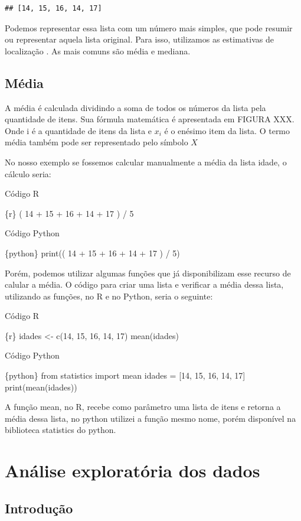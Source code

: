 \documentclass[
]{book}
\begin{document}
\begin{verbatim}
## [14, 15, 16, 14, 17]
\end{verbatim}

Podemos representar essa lista com um número mais simples, que pode resumir ou representar aquela lista original. Para isso, utilizamos as estimativas de localização \citep{bruce2020practical}. As mais comuns são média e mediana.

\section{Média}\label{muxe9dia}

A média é calculada dividindo a soma de todos os números da lista pela quantidade de itens. Sua fórmula matemática é apresentada em FIGURA XXX. Onde i é a quantidade de itens da lista e \(x_i\) é o enésimo item da lista. O termo média também pode ser representado pelo símbolo \(X\)

No nosso exemplo se fossemos calcular manualmente a média da lista idade, o cálculo seria:

Código R

\{r\} ( 14 + 15 + 16 + 14 + 17 ) / 5

Código Python

\{python\} print(( 14 + 15 + 16 + 14 + 17 ) / 5)

Porém, podemos utilizar algumas funções que já disponibilizam esse recurso de calular a média. O código para criar uma lista e verificar a média dessa lista, utilizando as funções, no R e no Python, seria o seguinte:

Código R

\{r\} idades \textless- c(14, 15, 16, 14, 17) mean(idades)

Código Python

\{python\} from statistics import mean idades = {[}14, 15, 16, 14, 17{]} print(mean(idades))

A função mean, no R, recebe como parâmetro uma lista de itens e retorna a média dessa lista, no python utilizei a função mesmo nome, porém disponível na biblioteca statistics do python.

\chapter{Análise exploratória dos dados}\label{anuxe1lise-exploratuxf3ria-dos-dados}

\section{Introdução}\label{introduuxe7uxe3o-1}
\end{document}
